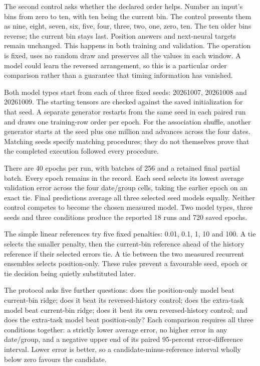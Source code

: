 The second control asks whether the declared order helps. Number an input's
bins from zero to ten, with ten being the current bin. The control presents
them as nine, eight, seven, six, five, four, three, two, one, zero, ten.
The ten older bins reverse; the current bin stays last. Position answers and
next-neural targets remain unchanged. This happens in both training and
validation. The operation is fixed, uses no random draw and preserves all
the values in each window. A model could learn the reversed arrangement,
so this is a particular order comparison rather than a guarantee that timing
information has vanished.

Both model types start from each of three fixed seeds: 20261007, 20261008 and
20261009. The starting tensors are checked against the saved initialization
for that seed. A separate generator restarts from the same seed in each
paired run and draws one training-row order per epoch. For the association
shuffle, another generator starts at the seed plus one million and advances
across the four dates. Matching seeds specify matching procedures; they do
not themselves prove that the completed execution followed every procedure.

There are 40 epochs per run, with batches of 256 and a retained final partial
batch. Every epoch remains in the record. Each seed selects its lowest
average validation error across the four date/group cells, taking the earlier
epoch on an exact tie. Final predictions average all three selected seed
models equally. Neither control competes to become the chosen measured model.
Two model types, three seeds and three conditions produce the reported
18 runs and 720 saved epochs.

The simple linear references try five fixed penalties: 0.01, 0.1, 1, 10 and
100. A tie selects the smaller penalty, then the current-bin reference ahead
of the history reference if their selected errors tie. A tie between the
two measured recurrent ensembles selects position-only. These rules prevent
a favourable seed, epoch or tie decision being quietly substituted later.

The protocol asks five further questions: does the position-only model beat
current-bin ridge; does it beat its reversed-history control; does the
extra-task model beat current-bin ridge; does it beat its own reversed-history
control; and does the extra-task model beat position-only? Each
comparison requires all three conditions together: a strictly lower average
error, no higher error in any date/group, and a negative upper end of its
paired 95-percent error-difference interval. Lower error is better, so a
candidate-minus-reference interval wholly below zero favours the candidate.

